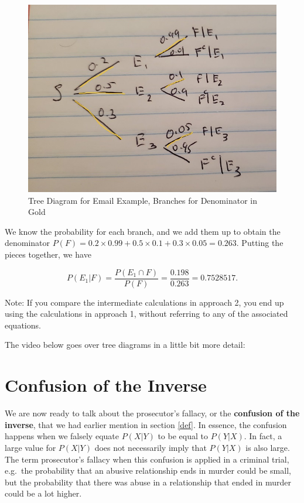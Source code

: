 \documentclass[
]{book}
\begin{document}
\begin{figure}
\centering
\includegraphics{images/02-treepath2.jpg}
\caption{\label{fig:tree2}Tree Diagram for Email Example, Branches for Denominator in Gold}
\end{figure}

We know the probability for each branch, and we add them up to obtain the denominator \(P(F) = 0.2 \times 0.99 + 0.5 \times 0.1 + 0.3 \times 0.05 = 0.263.\) Putting the pieces together, we have

\[
P(E_1|F) = \frac{P(E_1 \cap F)}{P(F)} = \frac{0.198}{0.263} = 0.7528517.
\]

Note: If you compare the intermediate calculations in approach 2, you end up using the calculations in approach 1, without referring to any of the associated equations.

The video below goes over tree diagrams in a little bit more detail:

\hypertarget{confusion}{%
\section{Confusion of the Inverse}\label{confusion}}

We are now ready to talk about the prosecutor's fallacy, or the \textbf{confusion of the inverse}, that we had earlier mention in section \ref{def}. In essence, the confusion happens when we falsely equate \(P(X|Y)\) to be equal to \(P(Y|X)\). In fact, a large value for \(P(X|Y)\) does not necessarily imply that \(P(Y|X)\) is also large. The term prosecutor's fallacy when this confusion is applied in a criminal trial, e.g.~the probability that an abusive relationship ends in murder could be small, but the probability that there was abuse in a relationship that ended in murder could be a lot higher.
\end{document}

